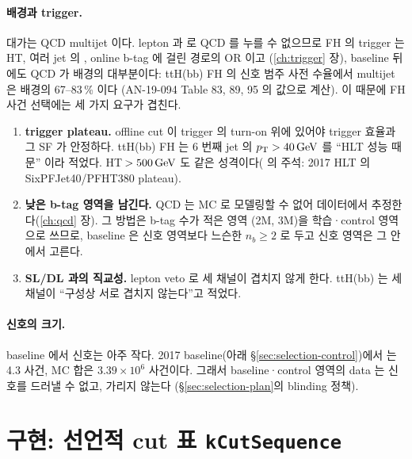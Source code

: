 \paragraph{배경과 trigger.}
대가는 QCD multijet 이다. lepton 과 \MET{} 로 QCD 를 누를 수 없으므로 FH 의 trigger 는 HT, 여러 jet 의 \pt, online b-tag 에 걸린 경로의 OR 이고
(\ref{ch:trigger} 장), baseline 뒤에도 QCD 가 배경의 대부분이다: ttH(bb) FH 의 신호 범주 사전 수율에서 multijet 은 배경의 67–83\,\% 이다
(AN-19-094 Table 83, 89, 95 의 값으로 계산). 이 때문에 FH 사건 선택에는 세 가지 요구가 겹친다.
\begin{enumerate}
\item \textbf{trigger plateau.} offline cut 이 trigger 의 turn-on 위에 있어야 trigger 효율과 그 SF 가 안정하다. ttH(bb) FH 는 6 번째 jet 의
      $p_{\mathrm{T}}>40\,\mathrm{GeV}$ 를 ``HLT 성능 때문'' 이라 적었다. HT\,$>500\,\mathrm{GeV}$ 도 같은 성격이다(
      의 주석: 2017 HLT 의 SixPFJet40/PFHT380 plateau).
\item \textbf{낮은 b-tag 영역을 남긴다.} QCD 는 MC 로 모델링할 수 없어 데이터에서 추정한다(\ref{ch:qcd} 장). 그 방법은 b-tag 수가 적은 영역
      (2M, 3M)을 학습·control 영역으로 쓰므로, baseline 은 신호 영역보다 느슨한 $n_b\ge2$ 로 두고 신호 영역은 그 안에서 고른다.
\item \textbf{SL/DL 과의 직교성.} lepton veto 로 세 채널이 겹치지 않게 한다. ttH(bb) 는 세 채널이 ``구성상 서로 겹치지 않는다''고
      적었다.
\end{enumerate}

\paragraph{신호의 크기.}
baseline 에서 신호는 아주 작다. 2017 baseline(아래 \S\ref{sec:selection-control})에서 \ttHH{} 는 4.3 사건, MC 합은 $3.39\times10^6$
사건이다. 그래서 baseline·control 영역의 data 는 신호를 드러낼 수 없고, 가리지 않는다
(\S\ref{sec:selection-plan}의 blinding 정책).

\section{구현: 선언적 cut 표 \texttt{kCutSequence}}\label{sec:selection-cuts}

